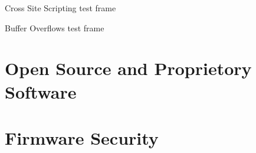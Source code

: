 \documentclass[10pt]{beamer}
\begin{document}
\begin{frame}[fragile]{Cross Site Scripting}
  test frame
\end{frame}

\begin{frame}[fragile]{Buffer Overflows}
  test frame
\end{frame}


\section{Open Source and Proprietory Software}


\section{Firmware Security}
\end{document}
